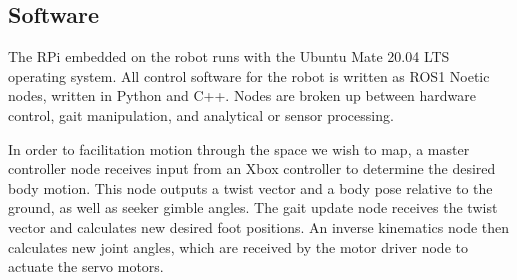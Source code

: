 \subsection{ Software }

The RPi embedded on the robot runs with the Ubuntu Mate 20.04 LTS operating system. All control software for the robot is written as ROS1 Noetic nodes, written in Python and C++. Nodes are broken up between hardware control, gait manipulation, and analytical or sensor processing.

In order to facilitation motion through the space we wish to map, a master controller node receives input from an Xbox controller to determine the desired body motion. This node outputs a twist vector and a body pose relative to the ground, as well as seeker gimble angles. The gait update node receives the twist vector and calculates new desired foot positions. An inverse kinematics node then calculates new joint angles, which are received by the motor driver node to actuate the servo motors.
